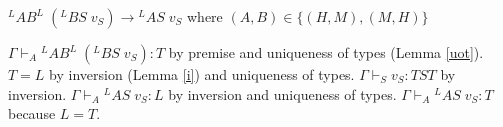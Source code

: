 \begin{case}
$^{L}AB^{L}\;(^{L}BS\;v_{S})\rightarrow{^{L}A}S\;v_{S}$ where $(A,B)\in\lbrace(H,M),(M,H)\rbrace$

$\Gamma\vdash_{A}{^{L}A}B^{L}\;(^{L}BS\;v_{S}):T$ by premise and uniqueness of types (Lemma \ref{uot}).  $T=L$ by inversion (Lemma \ref{i}) and uniqueness of types.  $\Gamma\vdash_{S}v_{S}:TST$ by inversion.  $\Gamma\vdash_{A}{^{L}A}S\;v_{S}:L$ by inversion and uniqueness of types.  $\Gamma\vdash_{A}{^{L}A}S\;v_{S}:T$ because $L=T$.
\end{case}